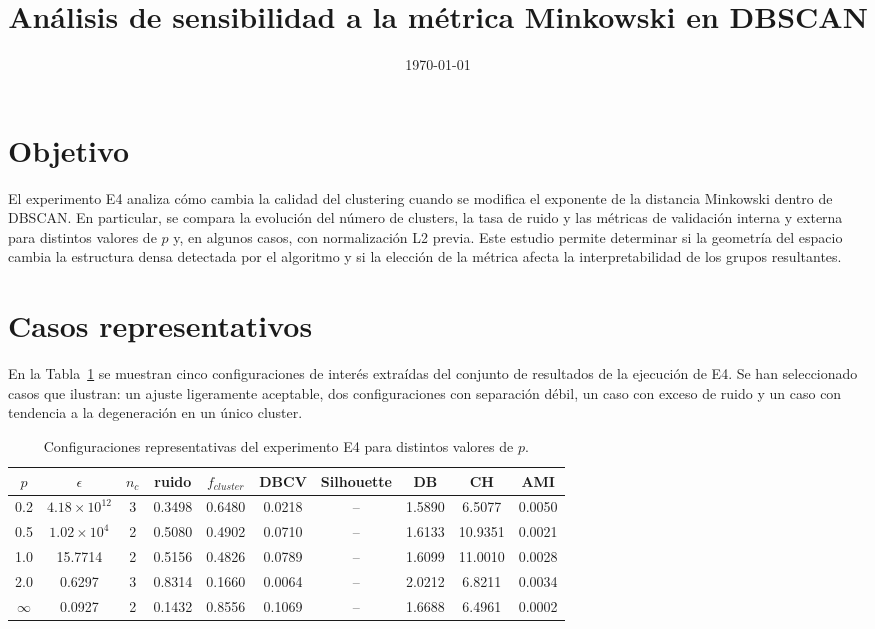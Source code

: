 \documentclass[11pt]{article}
\title{Análisis de sensibilidad a la métrica Minkowski en DBSCAN}
\author{}
\date{\today}
\begin{document}
\maketitle

\section{Objetivo}

El experimento E4 analiza cómo cambia la calidad del clustering cuando se modifica el exponente de la distancia Minkowski dentro de DBSCAN. En particular, se compara la evolución del número de clusters, la tasa de ruido y las métricas de validación interna y externa para distintos valores de $p$ y, en algunos casos, con normalización L2 previa. Este estudio permite determinar si la geometría del espacio cambia la estructura densa detectada por el algoritmo y si la elección de la métrica afecta la interpretabilidad de los grupos resultantes.

\section{Casos representativos}

En la Tabla~\ref{tab:casos} se muestran cinco configuraciones de interés extraídas del conjunto de resultados de la ejecución de E4. Se han seleccionado casos que ilustran: un ajuste ligeramente aceptable, dos configuraciones con separación débil, un caso con exceso de ruido y un caso con tendencia a la degeneración en un único cluster.

\begin{table}[H]
\centering
\scriptsize
\begin{tabular}{cccccccccc}
\toprule
$p$ & $\epsilon$ & $n_c$ & ruido & $f_{cluster}$ & DBCV & Silhouette & DB & CH & AMI \\
\midrule
0.2 & $4.18\times 10^{12}$ & 3 & 0.3498 & 0.6480 & 0.0218 & -- & 1.5890 & 6.5077 & 0.0050 \\
0.5 & $1.02\times 10^{4}$ & 2 & 0.5080 & 0.4902 & 0.0710 & -- & 1.6133 & 10.9351 & 0.0021 \\
1.0 & 15.7714 & 2 & 0.5156 & 0.4826 & 0.0789 & -- & 1.6099 & 11.0010 & 0.0028 \\
2.0 & 0.6297 & 3 & 0.8314 & 0.1660 & 0.0064 & -- & 2.0212 & 6.8211 & 0.0034 \\
$\infty$ & 0.0927 & 2 & 0.1432 & 0.8556 & 0.1069 & -- & 1.6688 & 6.4961 & 0.0002 \\
\bottomrule
\end{tabular}
\caption{Configuraciones representativas del experimento E4 para distintos valores de $p$.}
\label{tab:casos}
\end{table}
\end{document}
